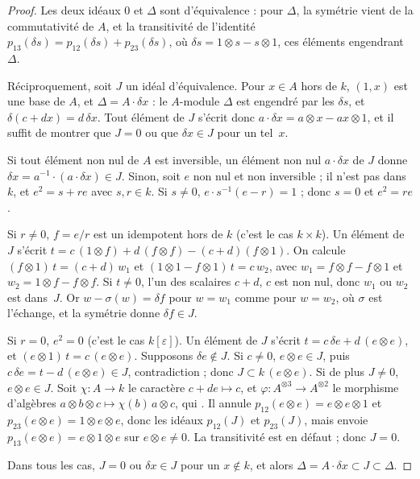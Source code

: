 \begin{proof}
Les deux idéaux $0$ et $\Delta$ sont d'équivalence : pour $\Delta$, la symétrie vient de la commutativité de $A$, et la transitivité de l'identité $p_{13}(\delta s) = p_{12}(\delta s) + p_{23}(\delta s)$, où $\delta s = 1 \otimes s - s \otimes 1$, ces éléments engendrant~$\Delta$.

Réciproquement, soit $J$ un idéal d'équivalence. Pour $x \in A$ hors de $k$, $(1, x)$ est une base de $A$, et $\Delta = A \cdot \delta x$ : le $A$-module $\Delta$ est engendré par les $\delta s$, et $\delta(c + dx) = d\,\delta x$. Tout élément de $J$ s'écrit donc $a \cdot \delta x = a \otimes x - ax \otimes 1$, et il suffit de montrer que $J = 0$ ou que $\delta x \in J$ pour un tel~$x$.

Si tout élément non nul de $A$ est inversible, un élément non nul $a \cdot \delta x$ de $J$ donne $\delta x = a^{-1} \cdot (a \cdot \delta x) \in J$. Sinon, soit $e$ non nul et non inversible ; il n'est pas dans $k$, et $e^2 = s + re$ avec $s, r \in k$. Si $s \neq 0$, $e \cdot s^{-1}(e - r) = 1$ ; donc $s = 0$ et $e^2 = re$.

Si $r \neq 0$, $f = e/r$ est un idempotent hors de $k$ (c'est le cas $k \times k$). Un élément de $J$ s'écrit $t = c\,(1 \otimes f) + d\,(f \otimes f) - (c + d)(f \otimes 1)$. On calcule $(f \otimes 1)\,t = (c + d)\,w_1$ et $(1 \otimes 1 - f \otimes 1)\,t = c\,w_2$, avec $w_1 = f \otimes f - f \otimes 1$ et $w_2 = 1 \otimes f - f \otimes f$. Si $t \neq 0$, l'un des scalaires $c + d$, $c$ est non nul, donc $w_1$ ou $w_2$ est dans~$J$. Or $w - \sigma(w) = \delta f$ pour $w = w_1$ comme pour $w = w_2$, où $\sigma$ est l'échange, et la symétrie donne $\delta f \in J$.

Si $r = 0$, $e^2 = 0$ (c'est le cas $k[\varepsilon]$). Un élément de $J$ s'écrit $t = c\,\delta e + d\,(e \otimes e)$, et $(e \otimes 1)\,t = c\,(e \otimes e)$. Supposons $\delta e \notin J$. Si $c \neq 0$, $e \otimes e \in J$, puis $c\,\delta e = t - d\,(e \otimes e) \in J$, contradiction ; donc $J \subset k\,(e \otimes e)$. Si de plus $J \neq 0$, $e \otimes e \in J$. Soit $\chi : A \to k$ le caractère $c + de \mapsto c$, et $\varphi : A^{\otimes 3} \to A^{\otimes 2}$ le morphisme d'algèbres $a \otimes b \otimes c \mapsto \chi(b)\, a \otimes c$, qui . Il annule $p_{12}(e \otimes e) = e \otimes e \otimes 1$ et $p_{23}(e \otimes e) = 1 \otimes e \otimes e$, donc les idéaux $p_{12}(J)$ et $p_{23}(J)$, mais envoie $p_{13}(e \otimes e) = e \otimes 1 \otimes e$ sur $e \otimes e \neq 0$. La transitivité est en défaut ; donc $J = 0$.

Dans tous les cas, $J = 0$ ou $\delta x \in J$ pour un $x \notin k$, et alors $\Delta = A \cdot \delta x \subset J \subset \Delta$.
\end{proof}

